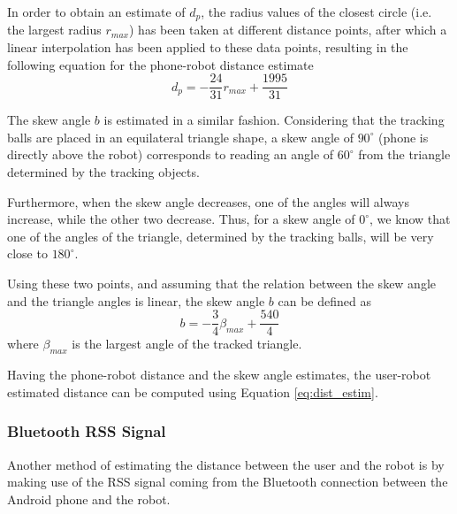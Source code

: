 \documentclass[journal]{IEEEtran}
\begin{document}
In order to obtain an estimate of $d_p$, the radius values of the closest circle (i.e. the largest radius $r_{max}$) has been taken at different distance points, after which a linear interpolation has been applied to these data points, resulting in the following equation for the phone-robot distance estimate
\begin{equation}
d_p=-\frac{24}{31}r_{max}+\frac{1995}{31}
\end{equation}

The skew angle $b$ is estimated in a similar fashion. Considering that the tracking balls are placed in an equilateral triangle shape, a skew angle of $90^{\circ}$ (phone is directly above the robot) corresponds to reading an angle of $60^{\circ}$ from the triangle determined by the tracking objects. 

Furthermore, when the skew angle decreases, one of the angles will always increase, while the other two decrease. Thus, for a skew angle of $0^{\circ}$, we know that one of the angles of the triangle, determined by the tracking balls, will be very close to $180^{\circ}$. 

Using these two points, and assuming that the relation between the skew angle and the triangle angles is linear, the skew angle $b$ can be defined as
\begin{equation}
b=-\frac{3}{4}\beta_{max}+\frac{540}{4}
\end{equation}
where $\beta_{max}$ is the largest angle of the tracked triangle.

Having the phone-robot distance and the skew angle estimates, the user-robot estimated distance can be computed using Equation \ref{eq:dist_estim}.

\subsubsection{Bluetooth RSS Signal}
Another method of estimating the distance between the user and the robot is by making use of the RSS signal coming from the Bluetooth connection between the Android phone and the robot.
\end{document}
